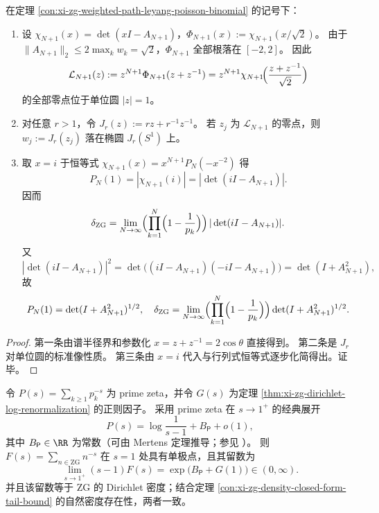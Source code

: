 

\begin{theorem}\label{con:xi-zg-unit-circle-joukowsky-spectral-determinant}
在定理 \ref{con:xi-zg-weighted-path-leyang-poisson-binomial} 的记号下：
\begin{enumerate}
  \item 设 \(\chi_{N+1}(x)=\det(xI-A_{N+1})\)，\(\Phi_{N+1}(x):=\chi_{N+1}(x/\sqrt2)\)。
  由于 \(\|A_{N+1}\|_{2}\le 2\max_k w_k=\sqrt2\)，\(\Phi_{N+1}\) 全部根落在 \([-2,2]\)。
  因此
  \[
  \mathcal L_{N+1}(z)
  :=z^{N+1}\Phi_{N+1}(z+z^{-1})
  =z^{N+1}\chi_{N+1}\!\Bigl(\frac{z+z^{-1}}{\sqrt2}\Bigr)
  \]
  的全部零点位于单位圆 \(|z|=1\)。
  \item 对任意 \(r>1\)，令 \(J_r(z):=rz+r^{-1}z^{-1}\)。
  若 \(z_j\) 为 \(\mathcal L_{N+1}\) 的零点，则 \(w_j:=J_r(z_j)\) 落在椭圆 \(J_r(S^1)\) 上。
  \item 取 \(x=i\) 于恒等式
  \(
  \chi_{N+1}(x)=x^{N+1}P_N(-x^{-2})
  \)
  得
  \[
  P_N(1)=|\chi_{N+1}(i)|=|\det(iI-A_{N+1})|.
  \]
  因而
  \[
  \delta_{\mathrm{ZG}}
  =\lim_{N\to\infty}
  \Bigl(\prod_{k=1}^N\Bigl(1-\frac1{p_k}\Bigr)\Bigr)\,|\det(iI-A_{N+1})|.
  \]
  又
  \[
  |\det(iI-A_{N+1})|^2
  =\det\!\bigl((iI-A_{N+1})(-iI-A_{N+1})\bigr)
  =\det(I+A_{N+1}^2),
  \]
  故
  \[
  P_N(1)=\det(I+A_{N+1}^2)^{1/2},
  \quad
  \delta_{\mathrm{ZG}}
  =\lim_{N\to\infty}
  \Bigl(\prod_{k=1}^N\Bigl(1-\frac1{p_k}\Bigr)\Bigr)\det(I+A_{N+1}^2)^{1/2}.
  \]
\end{enumerate}
\end{theorem}
\begin{proof}
第一条由谱半径界和参数化 \(x=z+z^{-1}=2\cos\theta\) 直接得到。
第二条是 \(J_r\) 对单位圆的标准像性质。
第三条由 \(x=i\) 代入与行列式恒等式逐步化简得出。证毕。
\end{proof}

\begin{corollary}[\texorpdfstring{$s=1$}{s=1} 处单极点与 Dirichlet 留数常数]\label{cor:xi-zg-dirichlet-residue}
令 \(P(s)=\sum_{k\ge 1}p_k^{-s}\) 为 prime zeta，并令 \(G(s)\) 为定理 \ref{thm:xi-zg-dirichlet-log-renormalization} 的正则因子。
采用 prime zeta 在 \(s\to 1^+\) 的经典展开
\[
P(s)=\log\frac1{s-1}+B_{\mathsf P}+o(1),
\]
其中 \(B_{\mathsf P}\in\RR\) 为常数（可由 Mertens 定理推导；参见 \cite{Apostol1976,Titchmarsh1986RiemannZeta}）。
则 \(F(s)=\sum_{n\in\mathrm{ZG}}n^{-s}\) 在 \(s=1\) 处具有单极点，且其留数为
\[
\lim_{s\to1^+}(s-1)F(s)=\exp\!\bigl(B_{\mathsf P}+G(1)\bigr)\in(0,\infty).
\]
并且该留数等于 \(\mathrm{ZG}\) 的 Dirichlet 密度；结合定理 \ref{con:xi-zg-density-closed-form-tail-bound} 的自然密度存在性，两者一致。
\end{corollary}

